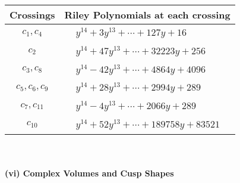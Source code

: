 \documentclass[1p]{elsarticle_modified}
\theoremstyle{definition}
\begin{document}
\begin{tabular}{m{50pt}|m{274pt}}
Crossings & \hspace{64pt}Riley Polynomials at each crossing \\
\hline $$\begin{aligned}c_{1},c_{4}\end{aligned}$$&$\begin{aligned}
&y^{14}+3 y^{13}+\cdots+127 y+16
\end{aligned}$\\
\hline $$\begin{aligned}c_{2}\end{aligned}$$&$\begin{aligned}
&y^{14}+47 y^{13}+\cdots+32223 y+256
\end{aligned}$\\
\hline $$\begin{aligned}c_{3},c_{8}\end{aligned}$$&$\begin{aligned}
&y^{14}-42 y^{13}+\cdots+4864 y+4096
\end{aligned}$\\
\hline $$\begin{aligned}c_{5},c_{6},c_{9}\end{aligned}$$&$\begin{aligned}
&y^{14}+28 y^{13}+\cdots+2994 y+289
\end{aligned}$\\
\hline $$\begin{aligned}c_{7},c_{11}\end{aligned}$$&$\begin{aligned}
&y^{14}-4 y^{13}+\cdots+2066 y+289
\end{aligned}$\\
\hline $$\begin{aligned}c_{10}\end{aligned}$$&$\begin{aligned}
&y^{14}+52 y^{13}+\cdots+189758 y+83521
\end{aligned}$\\
\hline
\end{tabular}\\~\\
\newpage\flushleft \textbf{(vi) Complex Volumes and Cusp Shapes}
\end{document}
